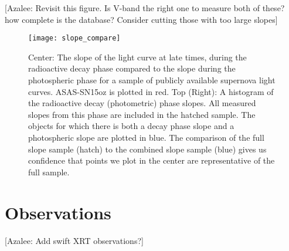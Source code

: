 \documentclass[preprint]{aastex61}
\newcommand{\azaleecomment}[1]{{\color{red} [{#1}]}}
\newcommand{\Azalee}[1]{\azaleecomment{Azalee: #1}}
\begin{document}
\Azalee{Revisit this figure. Is V-band the right one to measure both of these? how complete is the database? Consider cutting those with too large slopes}
\begin{figure}[h!] 
\begin{center}
\texttt{[image: slope\_compare]} %
\caption{Center: The slope of the light curve at late times, during the radioactive decay phase compared to the slope during the photospheric phase for a sample of publicly available supernova light curves.
ASAS-SN15oz is plotted in red.
Top (Right): A histogram of the radioactive decay (photometric) phase slopes. All measured slopes from this phase are included in the hatched sample.
The objects for which there is both a decay phase slope and a photospheric slope are plotted in blue. The comparison of the full slope sample (hatch) to the combined slope sample (blue) gives us confidence that points we plot in the center are representative of the full sample.}
\label{fig:SlopeComp}
\end{center}
\end{figure}

\clearpage
\section{Observations}
 \label{tab:SpecObs}
\Azalee{Add swift XRT observations?}
\startlongtable
 \label{tab:LcObs}
\facility{}



\end{document}

